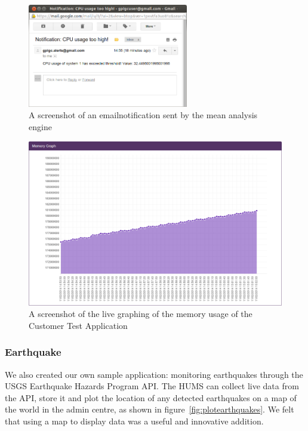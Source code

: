 \documentclass[10pt,a4paper]{article}
\begin{document}

\begin{figure}[htbp!]
  \centering
  \includegraphics[width=7cm]{images/TestApplicationCPUAlert.png}
  \caption{A screenshot of an emailnotification  sent by the mean analysis engine}
  \label{fig:alerting}
\end{figure}

\begin{figure}[htbp!]
  \centering
  \includegraphics[width=12cm]{images/TestApplicationMemoryGraph.png}
  \caption{A screenshot of the live graphing of the memory usage of the Customer 
  Test Application}
  \label{fig:graphing}
\end{figure}

\subsubsection{Earthquake}
We also created our own sample application: monitoring earthquakes 
through the USGS Earthquake Hazards Program API. The HUMS
can collect live data from the API, store it and plot the location of any
detected earthquakes on a map of the world in the admin centre, as shown
in figure~\ref{fig:plotearthquakes}. We felt that using a map to display
data was a useful and innovative addition.
\end{document}
